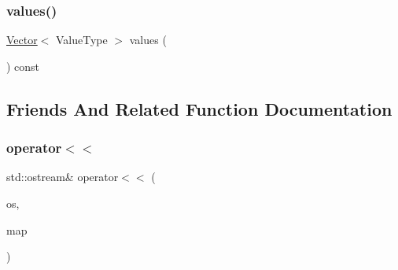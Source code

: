 \subsubsection{\texorpdfstring{values()}{values()}}
{\footnotesize\ttfamily \mbox{\hyperlink{classVector}{Vector}}$<$ Value\+Type $>$ values (\begin{DoxyParamCaption}{ }\end{DoxyParamCaption}) const}



\subsection{Friends And Related Function Documentation}
\mbox{\label{classLinkedHashMap_a98e6d7a4ebf5ff3bcb6a62268ae57280}} 
\subsubsection{\texorpdfstring{operator$<$$<$}{operator<<}}
{\footnotesize\ttfamily std\+::ostream\& operator$<$$<$ (\begin{DoxyParamCaption}\item[{std\+::ostream \&}]{os,  }\item[{const \mbox{\hyperlink{classLinkedHashMap}{Linked\+Hash\+Map}}$<$ K, V $>$ \&}]{map }\end{DoxyParamCaption})\hspace{0.3cm}{\ttfamily [friend]}}

